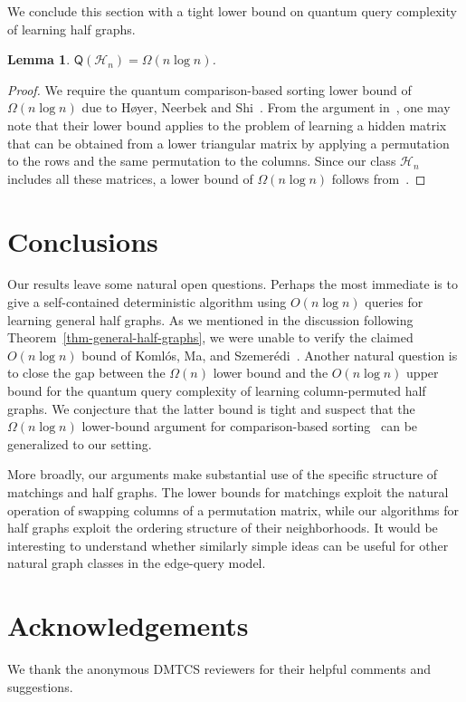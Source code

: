 \documentclass[11pt]{article}
\newcommand{\cH}{\mathcal{H}}
\newcommand{\sQ}{\mathsf{Q}}
\newtheorem{lemma}[theorem]{Lemma}
\begin{document}
We conclude this section with a tight lower bound on quantum query complexity of learning half graphs.
\begin{lemma}\label{lem:quantum-lower-half-graphs}
    $\sQ(\cH_n) = \Omega(n \log n)$.
\end{lemma}

\begin{proof}
    We require the quantum comparison-based sorting lower bound of $\Omega(n \log n)$ due to H\o yer, Neerbek and Shi~\cite{HNS02}. From the argument in~\cite[Section~5]{HNS02}, one may note that their lower bound applies to the problem of learning a hidden matrix that can be obtained from a lower triangular matrix by applying a permutation to the rows and the same permutation to the columns. Since our class $\cH_n$ includes all these matrices, a lower bound of $\Omega(n \log n)$ follows from~\cite[Theorem~2]{HNS02}.
\end{proof}

\section{Conclusions}\label{sec:conc}
Our results leave some natural open questions. Perhaps the most immediate is to give a self-contained deterministic algorithm using $O(n\log n)$ queries for learning general half graphs. As we mentioned in the discussion following Theorem~\ref{thm-general-half-graphs}, we were unable to verify the claimed $O(n\log n)$ bound of Koml{\'{o}}s, Ma, and Szemer{\'{e}}di~\cite{KMS98}. Another natural question is to close the gap between the $\Omega(n)$ lower bound and the $O(n\log n)$ upper bound for the quantum query complexity of learning column-permuted half graphs. We conjecture that the latter bound is tight and suspect that the $\Omega(n \log n)$ lower-bound argument for comparison-based sorting~\cite[Theorem~2]{HNS02} can be generalized to our setting.

More broadly, our arguments make substantial use of the specific structure of matchings and half graphs. The lower bounds for matchings exploit the natural operation of swapping columns of a permutation matrix, while our algorithms for half graphs exploit the ordering structure of their neighborhoods. It would be interesting to understand whether similarly simple ideas can be useful for other natural graph classes in the edge-query model.

\section*{Acknowledgements}
We thank the anonymous DMTCS reviewers for their helpful comments and suggestions.
\end{document}
